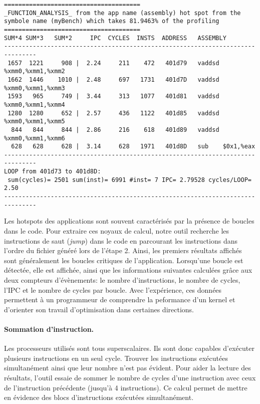 \begin{lstlisting}[label=lst:dev_op_extract_out, caption={L'outil Oprofile++ permet d'afficher le profil des principaux kernels de l'application.}]
======================================
_FUNCTION_ANALYSIS_ from the app name (assembly) hot spot from the symbole name (myBench) which takes 81.9463% of the profiling
======================================
SUM*4 SUM*3   SUM*2     IPC  CYCLES  INSTS  ADDRESS   ASSEMBLY  
-------------------------------------------------------------------------------
 1657  1221     908 |  2.24     211    472   401d79   vaddsd %xmm0,%xmm1,%xmm2
 1662  1446    1010 |  2.48     697   1731   401d7D   vaddsd %xmm0,%xmm1,%xmm3
 1593   965     749 |  3.44     313   1077   401d81   vaddsd %xmm0,%xmm1,%xmm4
 1280  1280     652 |  2.57     436   1122   401d85   vaddsd %xmm0,%xmm1,%xmm5
  844   844     844 |  2.86     216    618   401d89   vaddsd %xmm0,%xmm1,%xmm6
  628   628     628 |  3.14     628   1971   401d8D   sub    $0x1,%eax
-------------------------------------------------------------------------------
LOOP from 401d73 to 401d8D:
 sum(cycles)= 2501 sum(inst)= 6991 #inst= 7 IPC= 2.79528 cycles/LOOP= 2.50
-------------------------------------------------------------------------------
\end{lstlisting} 

        Les \glspl{hotspot} des applications sont souvent caractérisés par la présence de boucles dans le code. Pour extraire ces noyaux de calcul, notre outil recherche les instructions de saut (\textit{jump}) dans le code en parcourant les instructions dans l'ordre du fichier généré lors de l'étape 2. Ainsi, les premiers résultats affichés sont généralement les boucles critiques de l'application. Lorsqu'une boucle est détectée, elle est affichée, ainsi que les informations suivantes calculées grâce aux deux compteurs d'évènements: le nombre d'instructions, le nombre de cycles, l'IPC et le nombre de cycles par boucle. Avec l'expérience, ces données permettent à un programmeur de comprendre la peformance d'un kernel et d'orienter son travail d'optimisation dans certaines directions.
        
        \paragraph{Sommation d'instruction.} Les processeurs utilisés sont tous superscalaires. Ils sont donc capables d'exécuter plusieurs instructions en un seul cycle. Trouver les instructions exécutées simultanément ainsi que leur nombre n'est pas évident. Pour aider la lecture des résultats, l'outil essaie de sommer le nombre de cycles d'une instruction avec ceux de l'instruction précédente (jusqu'à 4 instructions). Ce calcul permet de mettre en évidence des blocs d'instructions exécutées simultanément.
        
